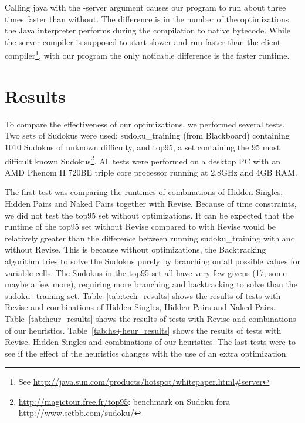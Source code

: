 \documentclass[11pt]{article} %
\begin{document}
Calling java with the -server argument causes our program to run about three times faster than without. The difference is in the number of the optimizations the Java interpreter performs during the compilation to native bytecode. While the server compiler is supposed to start slower and run faster than the client compiler\footnote{See \url{http://java.sun.com/products/hotspot/whitepaper.html\#server}}, with our program the only noticable difference is the faster runtime.

\section{Results}
\label{sec:results}

To compare the effectiveness of our optimizations, we performed several tests. Two sets of Sudokus were used: sudoku\_training (from Blackboard) containing 1010 Sudokus of unknown difficulty, and top95, a set containing the 95 most difficult known Sudokus\footnote{\url{http://magictour.free.fr/top95}: benchmark on Sudoku fora \url{http://www.setbb.com/sudoku/}}. All tests were performed on a desktop PC with an AMD Phenom II 720BE triple core processor running at 2.8GHz and 4GB RAM.

The first test was comparing the runtimes of combinations of Hidden Singles, Hidden Pairs and Naked Pairs together with Revise. Because of time constraints, we did not test the top95 set without optimizations. It can be expected that the runtime of the top95 set without Revise compared to with Revise would be relatively greater than the difference between running sudoku\_training with and without Revise. This is because without optimizations, the Backtracking algorithm tries to solve the Sudokus purely by branching on all possible values for variable cells. The Sudokus in the top95 set all have very few givens (17, some maybe a few more), requiring more branching and backtracking to solve than the sudoku\_training set.
Table~\ref{tab:tech_results} shows the results of tests with Revise and combinations of Hidden Singles, Hidden Pairs and Naked Pairs. Table~\ref{tab:heur_results} shows the results of tests with Revise and combinations of our heuristics. Table~\ref{tab:hs+heur_results} shows the results of tests with Revise, Hidden Singles and combinations of our heuristics. The last tests were to see if the effect of the heuristics changes with the use of an extra optimization.
\end{document}
